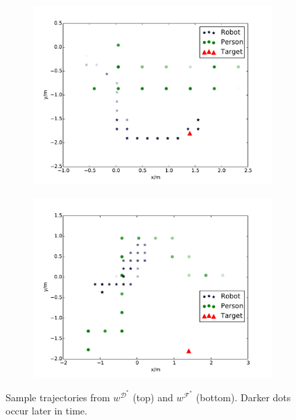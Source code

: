 \documentclass[a4paper,11pt]{report}
\begin{document}
\begin{figure}[htb]

	\centering
	\begin{subfigure}[b]{0.4\columnwidth}
    \hspace{-5mm}
    \includegraphics[scale = 0.35]{figures/gp.pdf}
    \end{subfigure}
    \begin{subfigure}[b]{0.4\columnwidth}
        \hspace{1mm}
    \includegraphics[scale = 0.35]{figures/bp.pdf}
  	\end{subfigure}
  \caption{Sample trajectories from $w^{\mathcal{D}^*}$ (top) and $w^{\mathcal{F}^*}$ (bottom). Darker dots occur later in time.} %
  \label{fig:paths}
\end{figure}
\end{document}
